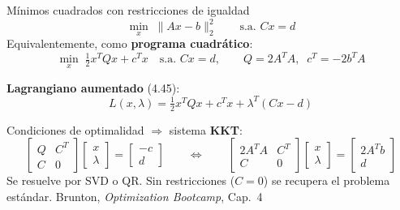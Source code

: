 \documentclass[10pt,aspectratio=169]{beamer}
\newcommand{\fuente}{\vfill{\scriptsize\color{gray}Brunton, \emph{Optimization Bootcamp}, Cap.~4}}
\begin{document}
\begin{frame}{Mínimos cuadrados con restricciones de igualdad}
  \small
  \[
    \min_x \; \|Ax-b\|_2^2
    \qquad \text{s.a. } Cx = d \tag{4.42}
  \]
  Equivalentemente, como \textbf{programa cuadrático}:
  \[
    \min_x \; \tfrac12 x^TQx + c^Tx
    \quad\text{s.a. } Cx=d,
    \qquad Q = 2A^TA,\;\; c^T = -2b^TA \tag{4.43--4.44}
  \]

  \textbf{Lagrangiano aumentado} (4.45):
  \[
    L(x,\lambda) = \tfrac12 x^TQx + c^Tx + \lambda^T(Cx-d)
  \]

  Condiciones de optimalidad $\Rightarrow$ sistema \textbf{KKT}:
  \[
    \begin{bmatrix} Q & C^T \\ C & 0 \end{bmatrix}
    \begin{bmatrix} x \\ \lambda \end{bmatrix}
    =
    \begin{bmatrix} -c \\ d \end{bmatrix}
    \qquad\Longleftrightarrow\qquad
    \begin{bmatrix} 2A^TA & C^T \\ C & 0 \end{bmatrix}
    \begin{bmatrix} x \\ \lambda \end{bmatrix}
    =
    \begin{bmatrix} 2A^Tb \\ d \end{bmatrix} \tag{4.47--4.48}
  \]
  \vspace{-2mm}
  {\footnotesize Se resuelve por SVD o QR. Sin restricciones
  ($C=0$) se recupera el problema estándar.}
  \fuente
\end{frame}
\end{document}
